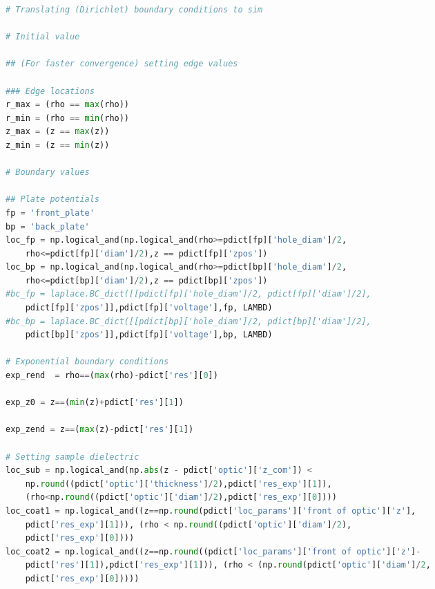 \begin{spacing}{1.2} \begin{lstlisting}[frame=single, language=Python]
# Translating (Dirichlet) boundary conditions to sim 

# Initial value 

## (For faster convergence) setting edge values

### Edge locations
r_max = (rho == max(rho))
r_min = (rho == min(rho))
z_max = (z == max(z))
z_min = (z == min(z))

# Boundary values 

## Plate potentials
fp = 'front_plate'
bp = 'back_plate'
loc_fp = np.logical_and(np.logical_and(rho>=pdict[fp]['hole_diam']/2,
    rho<=pdict[fp]['diam']/2),z == pdict[fp]['zpos'])
loc_bp = np.logical_and(np.logical_and(rho>=pdict[bp]['hole_diam']/2,
    rho<=pdict[bp]['diam']/2),z == pdict[bp]['zpos'])
#bc_fp = laplace.BC_dict([[pdict[fp]['hole_diam']/2, pdict[fp]['diam']/2], 
    pdict[fp]['zpos']],pdict[fp]['voltage'],fp, LAMBD)
#bc_bp = laplace.BC_dict([[pdict[bp]['hole_diam']/2, pdict[bp]['diam']/2], 
    pdict[bp]['zpos']],pdict[fp]['voltage'],bp, LAMBD)

# Exponential boundary conditions
exp_rend  = rho==(max(rho)-pdict['res'][0])

exp_z0 = z==(min(z)+pdict['res'][1])

exp_zend = z==(max(z)-pdict['res'][1])

# Setting sample dielectric
loc_sub = np.logical_and(np.abs(z - pdict['optic']['z_com']) < 
    np.round((pdict['optic']['thickness']/2),pdict['res_exp'][1]), 
    (rho<np.round((pdict['optic']['diam']/2),pdict['res_exp'][0])))
loc_coat1 = np.logical_and((z==np.round(pdict['loc_params']['front of optic']['z'],
    pdict['res_exp'][1])), (rho < np.round((pdict['optic']['diam']/2), 
    pdict['res_exp'][0])))
loc_coat2 = np.logical_and((z==np.round((pdict['loc_params']['front of optic']['z']-
    pdict['res'][1]),pdict['res_exp'][1])), (rho < (np.round(pdict['optic']['diam']/2, 
    pdict['res_exp'][0]))))
\end{lstlisting} \end{spacing}

